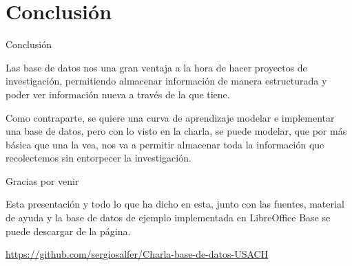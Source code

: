 \documentclass[11pt]{beamer}
\begin{document}
\section{Conclusión}

\begin{frame}{Conclusión}

Las base de datos nos una gran ventaja a la hora de hacer proyectos de investigación, permitiendo almacenar información de manera estructurada y poder ver información nueva a través de la que tiene.

Como contraparte, se quiere una curva de aprendizaje modelar e implementar una base de datos, pero con lo visto en la charla, se puede modelar, que por más básica que una la vea, nos va a permitir almacenar toda la información que recolectemos sin entorpecer la investigación.

\end{frame}


\begin{frame}{Gracias por venir}

Esta presentación y todo lo que ha dicho en esta, junto con las fuentes, material de ayuda y la base de datos de ejemplo implementada en LibreOffice Base se puede descargar de la página.

\begin{center}
	\url{https://github.com/sergiosalfer/Charla-base-de-datos-USACH}
\end{center}



\end{frame}
\end{document}
